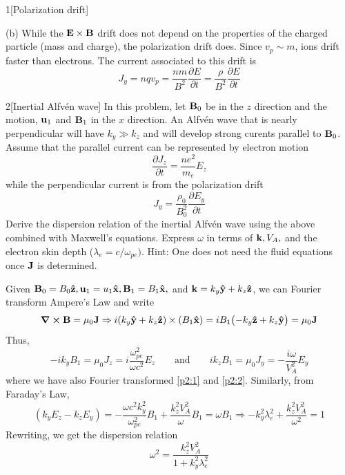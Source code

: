 \documentclass[12pt]{article}
\begin{document}
\begin{problem}{1}[Polarization drift]
\begin{solution}
(b) While the $\vb{E}\times\vb{B}$ drift does not depend on the properties of
the charged particle (mass and charge), the polarization drift does. Since
$v_p\sim m$, ions drift faster than electrons. The current associated to this
drift is
\begin{equation}
    J_y=nqv_p=\frac{nm}{B^2}\frac{\partial E}{\partial t}
    =\frac{\rho}{B^2}\frac{\partial E}{\partial t}
\end{equation}
\end{solution}
\end{problem}
\begin{problem}{2}[Inertial Alfvén wave]
In this problem, let $\vb{B}_0$ be in the $z$ direction and the motion,
$\vb{u}_1$ and $\vb{B}_1$ in the $x$ direction. An Alfvén wave that is nearly
perpendicular will have $k_y\gg k_z$ and will develop strong curents parallel to
$\vb{B}_0$. Assume that the parallel current can be represented by electron
motion
\begin{equation}\label{p2:1}
    \frac{\partial J_z}{\partial t}=\frac{ne^2}{m_e}E_z 
\end{equation}
while the perpendicular current is from the polarization drift
\begin{equation}\label{p2:2}
    J_y=\frac{\rho_0}{B_0^2}\frac{\partial E_y}{\partial t} 
\end{equation}
Derive the dispersion relation of the inertial Alfvén wave using the above
combined with Maxwell's equations. Express $\omega$ in terms of $\vb{k},V_A,$
and the electron skin depth ($\lambda_e=c /\omega_{pe})$. Hint: One does not
need the fluid equations once $\vb{J}$ is determined.
\begin{solution}
Given $\vb{B}_0=B_0\vb{\hat{z}},\vb{u}_1=u_1\vb{\hat{x}},\vb{B}_1=B_1\vb{\hat{x}},$ and
$\vb{k}=k_y\vb{\hat{y}}+k_z\vb{\hat{z}}$, we can Fourier transform Ampere's Law and write
\begin{equation}
    \curl{\vb{B}}=\mu_0\vb{J}
    \Rightarrow i(k_y\vb{\hat{y}}+k_z\vb{\hat{z}})\times\qty(B_1\vb{\hat{x}})
    =iB_1\qty(-k_y\vb{\hat{z}}+k_z\vb{\hat{y}})=\mu_0\vb{J}
\end{equation}
Thus,
\begin{equation}
    -ik_yB_1=\mu_0J_z=i\frac{\omega_{pe}^2}{\omega c^2}E_z\qquad\text{and}\qquad
    ik_zB_1=\mu_0J_y=-\frac{i\omega}{V_A^2}E_y
\end{equation}
where we have also Fourier transformed \eqref{p2:1} and \eqref{p2:2}. Similarly,
from Faraday's Law,
\begin{equation}
    (k_yE_z-k_zE_y)=-\frac{\omega
    c^2k_y^2}{\omega_{pe}^2}B_1+\frac{k_z^2V_A^2}{\omega}B_1=\omega B_1
    \Rightarrow -k_y^2\lambda_e^2+\frac{k_z^2V_A^2}{\omega^2}=1
\end{equation}
Rewriting, we get the dispersion relation
\begin{equation}
    \omega^2=\frac{k_z^2V_A^2}{1+k_y^2\lambda_e^2} 
\end{equation}
\end{solution}
\end{problem}
\end{document}
